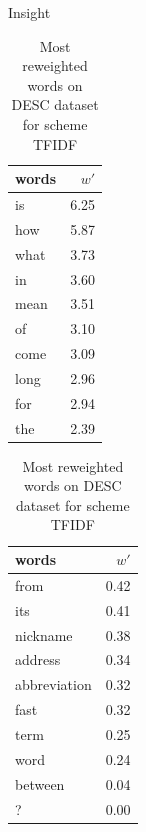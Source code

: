 \documentclass[xcolor={table}]{beamer}
\begin{document}
\begin{frame}[fragile]{Insight}
\small
\begin{table}[h]
    \centering
    \begin{minipage}{.4\linewidth}
      \centering
        \begin{tabular}{lr}
\toprule
words &  $w'$ \\
\midrule
   is &  6.25 \\
  how &  5.87 \\
 what &  3.73 \\
   in &  3.60 \\
 mean &  3.51 \\
   of &  3.10 \\
 come &  3.09 \\
 long &  2.96 \\
  for &  2.94 \\
  the &  2.39 \\
\bottomrule
\end{tabular}

    \end{minipage}
    \begin{minipage}{.4\linewidth}
      \centering
        \begin{tabular}{lr}
\toprule
        words &  $w'$ \\
\midrule
         from &  0.42 \\
          its &  0.41 \\
     nickname &  0.38 \\
      address &  0.34 \\
 abbreviation &  0.32 \\
         fast &  0.32 \\
         term &  0.25 \\
         word &  0.24 \\
      between &  0.04 \\
            ? &  0.00 \\
\bottomrule
\end{tabular}

    \end{minipage} 
    \caption{Most reweighted words on DESC dataset for scheme TFIDF}
    \label{tab:words:trec:tfidf}
\end{table}
\end{frame}
\end{document}

